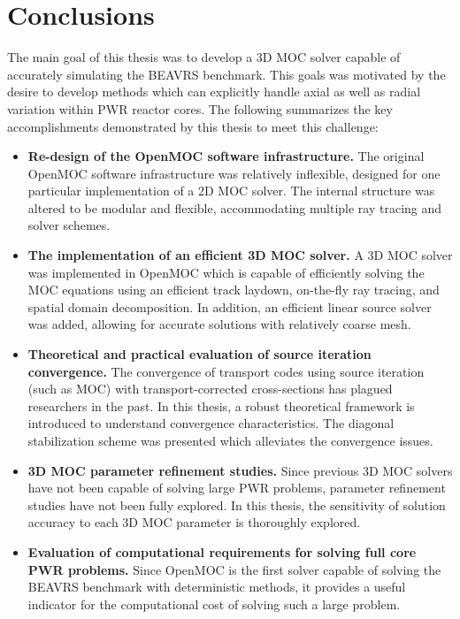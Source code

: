 \documentclass[12pt,twoside]{mitthesis-exec}
\begin{document}
\clearpage

\section*{Conclusions}

The main goal of this thesis was to develop a 3D MOC solver capable of accurately simulating the BEAVRS benchmark. This goals was motivated by the desire to develop methods which can explicitly handle axial as well as radial variation within PWR reactor cores. The following summarizes the key accomplishments demonstrated by this thesis to meet this challenge:

\begin{itemize}

\item \textbf{Re-design of the OpenMOC software infrastructure.} The original OpenMOC software infrastructure was relatively inflexible, designed for one particular implementation of a 2D MOC solver. The internal structure was altered to be modular and flexible, accommodating multiple ray tracing and solver schemes.

\item \textbf{The implementation of an efficient 3D MOC solver.} A 3D MOC solver was implemented in OpenMOC which is capable of efficiently solving the MOC equations using an efficient track laydown, on-the-fly ray tracing, and spatial domain decomposition. In addition, an efficient linear source solver was added, allowing for accurate solutions with relatively coarse mesh.

\item \textbf{Theoretical and practical evaluation of source iteration convergence.} The convergence of transport codes using source iteration (such as MOC) with transport-corrected cross-sections has plagued researchers in the past. In this thesis, a robust theoretical framework is introduced to understand convergence characteristics. The diagonal stabilization scheme was presented which alleviates the convergence issues.

\item \textbf{3D MOC parameter refinement studies.} Since previous 3D MOC solvers have not been capable of solving large PWR problems, parameter refinement studies have not been fully explored. In this thesis, the sensitivity of solution accuracy to each 3D MOC parameter is thoroughly explored.

\item \textbf{Evaluation of computational requirements for solving full core PWR problems.} Since OpenMOC is the first solver capable of solving the BEAVRS benchmark with deterministic methods, it provides a useful indicator for the computational cost of solving such a large problem.

\end{itemize}
\end{document}
